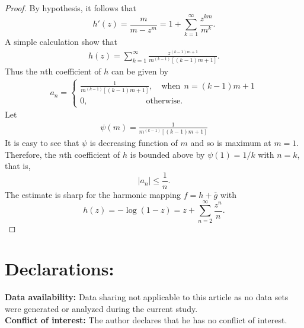 \documentclass[a4paper,12pt]{amsart}
\theoremstyle{definition}
\begin{document}
	\begin{proof}
		By hypothesis, it follows that   $$h'(z)=\frac{m}{m-z^m}=1+\sum\limits_{k=1}^\infty \frac{z^{km}}{m^k}.$$ A simple calculation show that 
		\begin{align*}
			h(z)=\sum\limits_{k=1}^\infty \frac{z^{(k-1)m+1}}{m^{(k-1)}[(k-1)m+1]}.
		\end{align*}
		Thus the $n$th coefficient of $h$ can be given by
		\begin{align}\label{P-180}
			a_n=
			\begin{cases}
				\frac{1}{m^{(k-1)}[(k-1)m+1]} ,\quad\text{when}~~n=(k-1)m+1 \\
				0,\quad\quad\quad\quad\quad\quad\quad\text{otherwise}.
			\end{cases}
		\end{align}
Let
		\begin{align*}
		 \psi(m)=\frac{1}{m^{(k-1)}[(k-1)m+1]}
		\end{align*}
		 It is easy to see that $\psi$ is decreasing function of $m$ and so is maximum at $m=1.$ Therefore, the $n$th coefficient of $h$ is bounded above by $\psi(1)=1/k$ with $n=k$, that is,  
		 $$|a_n|\le \frac{1}{n}.$$
		 	The estimate is sharp for the harmonic mapping $f=h+\overline{g}$ with $$h(z)=-\log{(1-z)}=z+\sum\limits_{n=2}^\infty \frac{z^n}{n}.$$
		 \end{proof}
	
	

	
	
	
	\section*{Declarations:}
	
	
	\noindent\textbf{Data availability:}
	Data sharing not applicable to this article as no data sets were generated or analyzed during the current study.\\
	
	
	
	
	

	
	\noindent\textbf{Conflict of interest:} The author declares that he has no conflict of interest.
	
\end{document}
